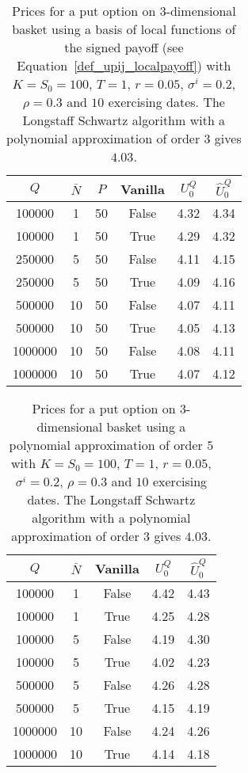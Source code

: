 \begin{table}[htb!]
    \centering\begin{tabular}{cccccc}
    \hline
    $Q$ & $\bar{N}$ & $P$ & Vanilla\phantom{$\Big|$} & $U_0^Q$ & $\hat{U}_0^Q$ \\
    \hline
    100000 & 1 & 50 & False & 4.32 & 4.34 \\
    100000 & 1 & 50 & True & 4.29 & 4.32 \\
    250000 & 5 & 50 & False & 4.11 & 4.15 \\
    250000 & 5 & 50 & True & 4.09 & 4.16 \\
    500000 & 10 & 50 & False & 4.07 & 4.11 \\
    500000 & 10 & 50 & True & 4.05 & 4.13 \\
    1000000 & 10 & 50 & False & 4.08 & 4.11 \\
    1000000 & 10 & 50 & True & 4.07 & 4.12 \\
    \hline
  \end{tabular}
  \caption{Prices for a put option on $3$-dimensional basket using a basis of local functions of the signed payoff (see Equation~\eqref{def_upij_localpayoff})  with $K = S_0 = 100$, $T = 1$, $r=0.05$, $\sigma^i=0.2$, $\rho = 0.3$ and $10$ exercising dates. The Longstaff Schwartz algorithm with a polynomial approximation of order $3$ gives $4.03$.}\label{tab:basket_3d_locpayoff}
\end{table}

\begin{table}[htbp!]
  \centering\begin{tabular}{ccccc}
    \hline
    $Q$ & $\bar{N}$ & Vanilla \phantom{$\Big|$} & $U_0^Q$ & $\hat{U}_0^Q$  \\
    \hline
    100000 & 1 & False & 4.42 & 4.43 \\
    100000 & 1 & True & 4.25 & 4.28 \\
    100000 & 5 & False & 4.19 & 4.30 \\
    100000 & 5 & True & 4.02 & 4.23 \\
    500000 & 5 & False & 4.26 & 4.28 \\
    500000 & 5 & True & 4.15 & 4.19 \\
    1000000 & 10 & False & 4.24 & 4.26 \\
    1000000 & 10 & True & 4.14 & 4.18 \\
    \hline
  \end{tabular}
  \caption{Prices for a put option on $3$-dimensional basket using a polynomial approximation of order $5$ with $K = S_0 = 100$, $T = 1$, $r=0.05$, $\sigma^i=0.2$, $\rho = 0.3$ and $10$ exercising dates. The Longstaff Schwartz algorithm with a polynomial approximation of order $3$ gives $4.03$.}
\end{table}




